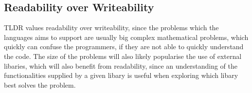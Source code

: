 \subsection{Readability over Writeability}

TLDR values readability over writeability, since the problems which the languages aims to support are usually big complex mathematical problems, which quickly can confuse the programmers, if they are not able to quickly understand the code. The size of the problems will also likely popularise the use of external libaries, which will also benefit from readability, since an understanding of the functionalities supplied by a given libary is useful when exploring which libary best solves the problem.






%
